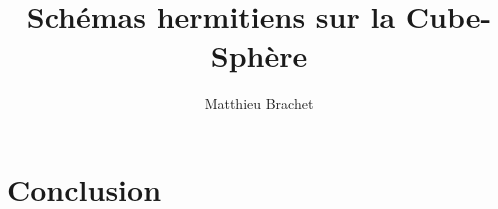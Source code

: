 \documentclass[10pt,a4paper]{amsart}
\title{Schémas hermitiens sur la Cube-Sphère}
\author{Matthieu Brachet}
\begin{document}
\maketitle

\tableofcontents












\section{Conclusion}





\end{document}
